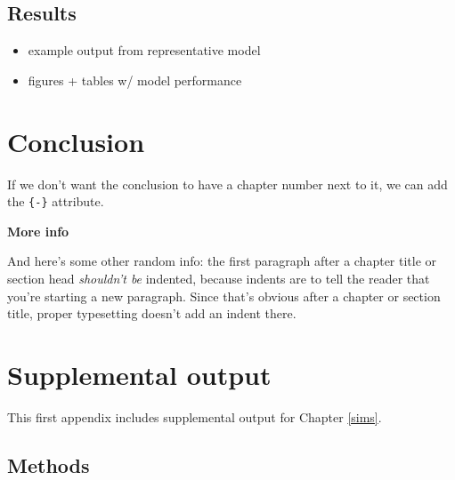 \documentclass[12pt, twoside]{amherstthesis}
\providecommand{\tightlist}{%
  \setlength{\itemsep}{0pt}\setlength{\parskip}{0pt}}
\begin{document}
\hypertarget{results}{%
\section{Results}\label{results}}
\begin{itemize}
\tightlist
\item
  example output from representative model
\item
  figures + tables w/ model performance
\end{itemize}
\hypertarget{conclusion}{%
\chapter*{Conclusion}\label{conclusion}}

If we don't want the conclusion to have a chapter number next to it, we can add the \texttt{\{-\}} attribute.

\textbf{More info}

And here's some other random info: the first paragraph after a chapter title or section head \emph{shouldn't be} indented, because indents are to tell the reader that you're starting a new paragraph. Since that's obvious after a chapter or section title, proper typesetting doesn't add an indent there.

\appendix

\hypertarget{appa}{%
\chapter{Supplemental output}\label{appa}}

This first appendix includes supplemental output for Chapter \ref{sims}.

\hypertarget{suppmethods}{%
\section{Methods}\label{suppmethods}}
\end{document}

